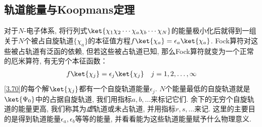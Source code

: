 \subsection{轨道能量与Koopmans定理}
对于$N$-电子体系, 
将行列式$\ket{\chi_1\chi_2\cdots\chi_a\chi_b\cdots\chi_N}$的能量极小化后就得到一组关于$N$个被占自旋轨道$\{\chi_a\}$的本征值方程$f\ket{\chi_a} = \epsilon_a\ket{\chi_a}$. 
Fock算符对这些被占轨道有泛函的依赖, 
但若这些被占轨道已知, 
那么Fock算符就变为一个正常的厄米算符, 
有无穷个本征函数：
\begin{align}
	\label{3.70}
	f\ket{\chi_j} = \epsilon_j\ket{\chi_j}\quad j = 1,2,\ldots,\infty
\end{align}
\autoref{3.70}的每个解$\ket{\chi_j}$都有一个自旋轨道能量$\epsilon_j$. $N$个能量最低的自旋轨道就是$\ket{\Psi_0}$中的占据自旋轨道, 我们用指标$a,b,\ldots$来标记它们. 余下的无穷个自旋轨道的能量更高, 我们称其为\emph{虚}轨道或未占轨道, 并用指标$r,s,\ldots$来记. 这里的主要目的是得到轨道能量$\epsilon_a,\epsilon_b$等等的能量, 并看看能为这些轨道能量赋予什么物理意义.

